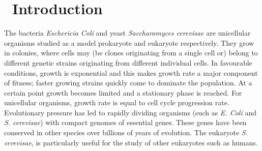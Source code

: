 \graphicspath{{images/}}

\section{\thesection~Introduction}
\label{sec:introduction}





The bacteria \textit{Eschericia Coli} and yeast \textit{Saccharomyces
  cerevisae} are unicellular organisms studied as a model prokaryote
and eukaryote respectively. They grow in colonies, where cells may (be
clones originating from a single cell or) belong to different genetic
strains originating from different individual cells. In favourable
conditions, growth is exponential and this makes growth rate a major
component of fitness; faster growing strains quickly come to dominate
the population. At a certain point growth becomes limited and a
stationary phase is reached. For unicellular organisms, growth rate is
equal to cell cycle progression rate. Evolutionary pressure has led to
rapidly dividing organisms (such as \textit{E. Coli} and \textit{S.
  cerevisae}) with compact genomes of essential genes. These genes
have been conserved in other species over billions of years of
evolution. The eukaryote \textit{S. cerevisae}, is particularly useful
for the study of other eukaryotes such as humans.

